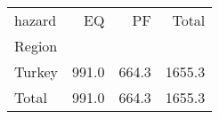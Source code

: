 \begin{tabular}{lrrr}
\toprule
hazard &     EQ &     PF &   Total \\
Region &        &        &         \\
\midrule
Turkey &  991.0 &  664.3 &  1655.3 \\
Total  &  991.0 &  664.3 &  1655.3 \\
\bottomrule
\end{tabular}
